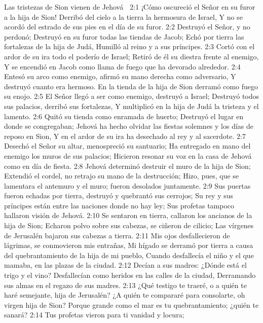Las tristezas de Sion vienen de Jehová  

2:1 ¡Cómo oscureció el Señor en su furor a la hija de Sion!  
Derribó del cielo a la tierra la hermosura de Israel,  
Y no se acordó del estrado de sus pies en el día de su furor.  
2:2 Destruyó el Señor, y no perdonó;  
Destruyó en su furor todas las tiendas de Jacob;  
Echó por tierra las fortalezas de la hija de Judá, 
Humilló al reino y a sus príncipes.  
2:3 Cortó con el ardor de su ira todo el poderío de Israel;  
Retiró de él su diestra frente al enemigo,  
Y se encendió en Jacob como llama de fuego que ha devorado alrededor.  
2:4 Entesó su arco como enemigo, afirmó su mano derecha como adversario,  
Y destruyó cuanto era hermoso.  
En la tienda de la hija de Sion derramó como fuego su enojo.  
2:5 El Señor llegó a ser como enemigo, destruyó a Israel;  
Destruyó todos sus palacios, derribó sus fortalezas,  
Y multiplicó en la hija de Judá la tristeza y el lamento.  
2:6 Quitó su tienda como enramada de huerto; 
Destruyó el lugar en donde se congregaban;  
Jehová ha hecho olvidar las fiestas solemnes y los días de reposo en Sion,  
Y en el ardor de su ira ha desechado al rey y al sacerdote.  
2:7 Desechó el Señor su altar, menospreció su santuario;  
Ha entregado en mano del enemigo los muros de sus palacios;  
Hicieron resonar su voz en la casa de Jehová como en día de fiesta.  
2:8 Jehová determinó destruir el muro de la hija de Sion;  
Extendió el cordel, no retrajo su mano de la destrucción;  
Hizo, pues, que se lamentara el antemuro y el muro; fueron desolados juntamente.  
2:9 Sus puertas fueron echadas por tierra, destruyó y quebrantó sus cerrojos;  
Su rey y sus príncipes están entre las naciones donde no hay ley;  
Sus profetas tampoco hallaron visión de Jehová.  
2:10 Se sentaron en tierra, callaron los ancianos de la hija de Sion;  
Echaron polvo sobre sus cabezas, se ciñeron de cilicio;  
Las vírgenes de Jerusalén bajaron sus cabezas a tierra.  
2:11 Mis ojos desfallecieron de lágrimas, se conmovieron mis entrañas,  
Mi hígado se derramó por tierra a causa del quebrantamiento de la hija de mi pueblo,  
Cuando desfallecía el niño y el que mamaba, en las plazas de la ciudad.  
2:12 Decían a sus madres: ¿Dónde está el trigo y el vino?  
Desfallecían como heridos en las calles de la ciudad,  
Derramando sus almas en el regazo de sus madres.  
2:13 ¿Qué testigo te traeré, o a quién te haré semejante, hija de Jerusalén?  
¿A quién te compararé para consolarte, oh virgen hija de Sion?  
Porque grande como el mar es tu quebrantamiento; ¿quién te sanará?  
2:14 Tus profetas vieron para ti vanidad y locura;  
